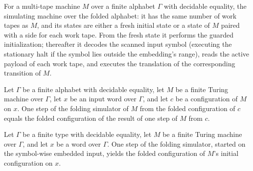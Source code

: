 \begin{definition}
\label{Turing.FinTM.foldTM}
\leanok
{}
For a multi-tape machine $M$ over a finite alphabet $\Gamma$ with decidable
equality, the simulating machine over the folded alphabet: it has the same number
of work tapes as $M$, and its states are either a fresh initial state or a state of
$M$ paired with a side for each work tape.  From the fresh state it performs the
guarded initialization; thereafter it decodes the scanned input symbol (executing
the stationary halt if the symbol lies outside the embedding's range), reads the
active payload of each work tape, and executes the translation of the corresponding
transition of $M$.
\end{definition}

\begin{lemma}
\label{Turing.FinTM.foldCfg_step}
\leanok
{}
Let $\Gamma$ be a finite alphabet with decidable equality, let $M$ be a finite Turing
machine over $\Gamma$, let $x$ be an input word over $\Gamma$, and let $c$ be a
configuration of $M$ on $x$. One step of the folding simulator of $M$ from the folded
configuration of $c$ equals the folded configuration of the result of one step of $M$
from $c$.
\end{lemma}

\begin{lemma}
\label{Turing.FinTM.foldCfg_init}
\leanok
{}
Let $\Gamma$ be a finite type with decidable equality, let $M$ be a finite Turing
machine over $\Gamma$, and let $x$ be a word over $\Gamma$. One step of the folding
simulator, started on the symbol-wise embedded input, yields the folded configuration of
$M$'s initial configuration on $x$.
\end{lemma}

